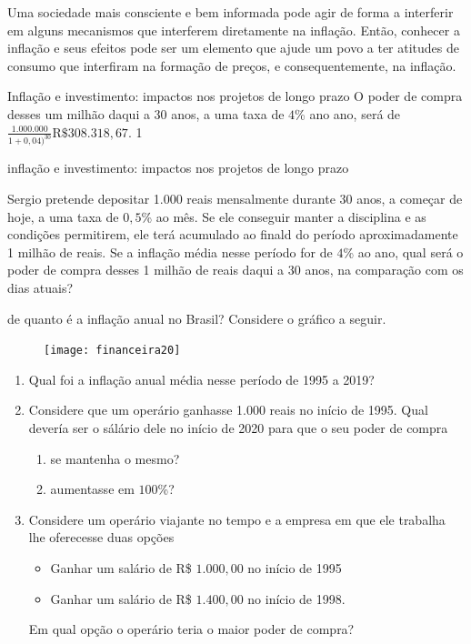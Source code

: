 Uma sociedade mais consciente e bem informada pode agir de forma a interferir em alguns mecanismos que interferem diretamente na inflação. Então, conhecer a inflação e seus efeitos pode ser um elemento que ajude um povo a ter atitudes de consumo que interfiram na formação de preços, e consequentemente, na inflação.


\begin{resposta}{Inflação e investimento: impactos nos projetos de longo prazo}
{
  O poder de compra desses um milhão daqui a 30 anos, a uma taxa de $4$\% ano ano, será de $\displaystyle\frac{1.000.000}{1+0{,}04)^{30}}\text{R\$ }308.318{,}67$. 
}{1}
\end{resposta}
\begin{task}{inflação e investimento: impactos nos projetos de longo prazo}

Sergio pretende depositar 1.000 reais mensalmente durante 30 anos, a começar de hoje, a uma taxa de $0{,}5$\% ao mês. Se ele conseguir manter a disciplina e as condições permitirem, ele terá acumulado ao finald do período aproximadamente 1 milhão de reais. Se a inflação média nesse período for de $4$\% ao ano, qual será o poder de compra desses 1 milhão de reais daqui a 30 anos, na comparação com os dias atuais?
\end{task}

\begin{task}{de quanto é a inflação anual no Brasil?}
Considere o gráfico a seguir.

\begin{figure}[H]
\centering

\texttt{[image: financeira20]}
\end{figure}

\begin{enumerate}
  \item Qual foi a inflação anual média nesse período de 1995 a 2019?
  \item Considere que um operário ganhasse 1.000 reais no início de 1995. Qual devería ser o sálário dele no início de 2020 para que o seu poder de compra
  \begin{enumerate}
    \item se mantenha o mesmo?
    \item aumentasse em $100$\%?
  \end{enumerate}
  \item Considere um operário viajante no tempo e a empresa em que ele trabalha lhe oferecesse duas opções
  \begin{itemize}
    \item Ganhar um salário de R\$ $1.000{,}00$ no início de 1995
    \item Ganhar um salário de R\$ $1.400{,}00$ no início de 1998.
  \end{itemize}
  Em qual opção o operário teria o maior poder de compra?
\end{enumerate}
\end{task}


